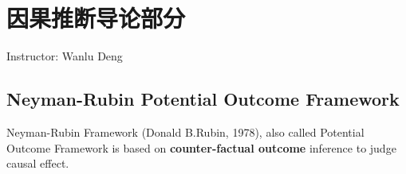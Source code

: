 \section{因果推断导论部分}\label{SecCausalInference}
\begin{center}
    Instructor: Wanlu Deng
\end{center}



\subsection{Neyman-Rubin Potential Outcome Framework}
    Neyman-Rubin Framework (Donald B.Rubin, 1978), also called Potential Outcome Framework is based on \textbf{counter-factual outcome} inference to judge causal effect. 


    
    
        

